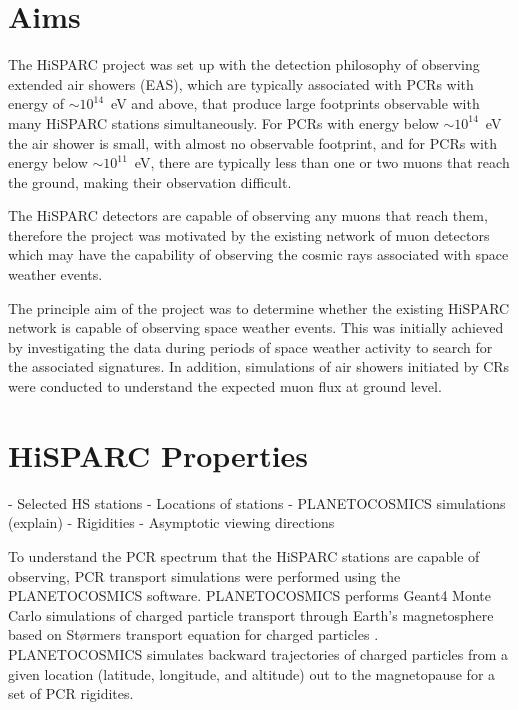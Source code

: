 \section{Aims}\label{sec:HS_aims}
The HiSPARC project was set up with the detection philosophy of observing extended air showers (EAS), which are typically associated with PCRs with energy of $\sim10^{14}$~eV and above, that produce large footprints observable with many HiSPARC stations simultaneously. For PCRs with energy below $\sim10^{14}$~eV the air shower is small, with almost no observable footprint, and for PCRs with energy below $\sim10^{11}$~eV, there are typically less than one or two muons that reach the ground, making their observation difficult. 

The HiSPARC detectors are capable of observing any muons that reach them, therefore the project was motivated by the existing network of muon detectors which may have the capability of observing the cosmic rays associated with space weather events.

The principle aim of the project was to determine whether the existing HiSPARC network is capable of observing space weather events. This was initially achieved by investigating the data during periods of space weather activity to search for the associated signatures. In addition, simulations of air showers initiated by CRs were conducted to understand the expected muon flux at ground level.


\section{HiSPARC Properties}\label{sec:HS_properties}
 - Selected HS stations
 - Locations of stations
 - PLANETOCOSMICS simulations (explain)
 - Rigidities
 - Asymptotic viewing directions
 

To understand the PCR spectrum that the HiSPARC stations are capable of observing, PCR transport simulations were performed using the PLANETOCOSMICS software. PLANETOCOSMICS performs Geant4 Monte Carlo simulations of charged particle transport through Earth's magnetosphere based on St\o rmers transport equation for charged particles \citep{desorgher_planetocosmics_2006}. PLANETOCOSMICS simulates backward trajectories of charged particles from a given location (latitude, longitude, and altitude) out to the magnetopause for a set of PCR rigidites. 

